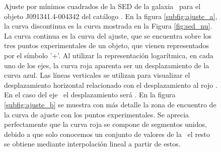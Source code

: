 \begin{figure}[H]
  \begin{center} 
  
      

  \end{center}
    
  \caption{\small Ajuste por mínimos cuadrados de la SED de la galaxia \smm\ para el objeto J091341.4-004342 del catálogo \hatlas. En la figura \ref{subfig:ajuste_a}, la curva discontinua es la curva mostrada en la Figura \ref{fig:sed_nu}. La curva continua es la curva del ajuste, que se encuentra sobre los tres puntos experimentales de un objeto, que vienen representados por el símbolo '+'. Al utilizar la representación logarítmica, en cada uno de los ejes, la curva roja aparenta ser un desplazamiento de la curva azul. Las líneas verticales se utilizan para visualizar el desplazamiento horizontal relacionado con el desplazamiento al rojo \z. En el caso del eje~ el desplazamiento será . En la figura \ref{subfig:ajuste_b} se muestra con más detalle la zona de encuentro de la curva de ajuste con los puntos experimentales. Se aprecia perfectamente que la curva roja se compone de segmentos unidos, debido a que solo conocemos un conjunto de  valores de la \sed\, el resto se obtiene mediante interpolación lineal a partir de estos.}
\end{figure}

